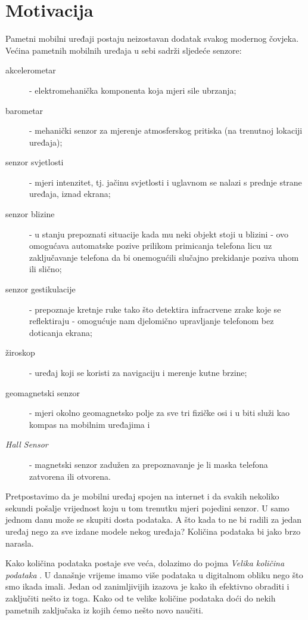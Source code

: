 \documentclass[times, utf8, zavrsni]{fer}
\begin{document}
\section{Motivacija}
Pametni mobilni uređaji postaju neizostavan dodatak svakog modernog čovjeka.\\
Većina pametnih mobilnih uređaja u sebi sadrži sljedeće senzore:
\begin{description}
	\item[akcelerometar] - elektromehanička komponenta koja mjeri sile ubrzanja;
	\item[barometar] - mehanički senzor za mjerenje atmosferskog pritiska (na trenutnoj lokaciji uređaja);
	\item[senzor svjetlosti] - mjeri intenzitet, tj. jačinu svjetlosti i uglavnom se nalazi s prednje strane uređaja, iznad ekrana;
	\item[senzor blizine] - u stanju prepoznati situacije kada mu neki objekt stoji u blizini - ovo omogućava automatske pozive prilikom primicanja telefona licu uz zaključavanje telefona da bi onemogućili slučajno prekidanje poziva uhom ili slično;
	\item[senzor gestikulacije] - prepoznaje kretnje ruke tako što detektira infracrvene zrake koje se reflektiraju - omogućuje nam djelomično upravljanje telefonom bez doticanja ekrana;
	\item[žiroskop] - uređaj koji se koristi za navigaciju i merenje kutne brzine;
	\item[geomagnetski senzor] - mjeri okolno geomagnetsko polje za sve tri fizičke osi i u biti služi kao kompas na mobilnim uređajima i 
	\item[\emph{Hall Sensor}] - magnetski senzor zadužen za prepoznavanje je li  maska telefona zatvorena ili otvorena.
\end{description}
Pretpostavimo da je mobilni uređaj spojen na internet i da svakih nekoliko sekundi pošalje vrijednost koju u tom trenutku mjeri pojedini senzor. U samo jednom danu može se skupiti dosta podataka. A što kada to ne bi radili za jedan uređaj nego za sve izdane modele nekog uređaja? Količina podataka bi jako brzo narasla.

Kako količina podataka postaje sve veća, dolazimo do pojma \emph{Velika količina podataka} . U današnje vrijeme imamo više podataka u digitalnom obliku nego što smo ikada imali. Jedan od zanimljivijih izazova je kako ih efektivno obraditi i zaključiti nešto iz toga. Kako od te velike količine podataka doći do nekih pametnih zaključaka iz kojih ćemo nešto novo naučiti.
\end{document}
